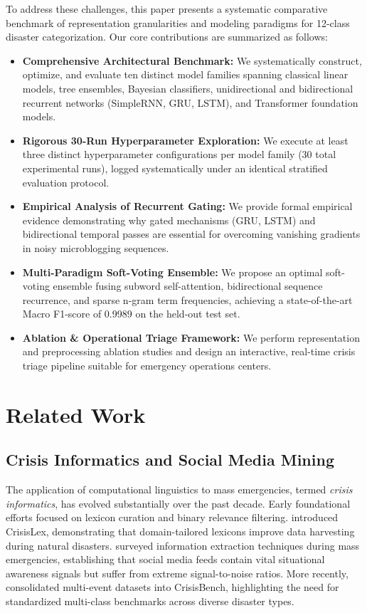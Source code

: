 \documentclass[11pt,a4paper]{article}
\begin{document}
To address these challenges, this paper presents a systematic comparative benchmark of representation granularities and modeling paradigms for 12-class disaster categorization. Our core contributions are summarized as follows:
\begin{itemize}
    \item \textbf{Comprehensive Architectural Benchmark:} We systematically construct, optimize, and evaluate ten distinct model families spanning classical linear models, tree ensembles, Bayesian classifiers, unidirectional and bidirectional recurrent networks (SimpleRNN, GRU, LSTM), and Transformer foundation models.
    \item \textbf{Rigorous 30-Run Hyperparameter Exploration:} We execute at least three distinct hyperparameter configurations per model family (30 total experimental runs), logged systematically under an identical stratified evaluation protocol.
    \item \textbf{Empirical Analysis of Recurrent Gating:} We provide formal empirical evidence demonstrating why gated mechanisms (GRU, LSTM) and bidirectional temporal passes are essential for overcoming vanishing gradients in noisy microblogging sequences.
    \item \textbf{Multi-Paradigm Soft-Voting Ensemble:} We propose an optimal soft-voting ensemble fusing subword self-attention, bidirectional sequence recurrence, and sparse n-gram term frequencies, achieving a state-of-the-art Macro F1-score of 0.9989 on the held-out test set.
    \item \textbf{Ablation & Operational Triage Framework:} We perform representation and preprocessing ablation studies and design an interactive, real-time crisis triage pipeline suitable for emergency operations centers.
\end{itemize}

\section{Related Work}
\label{sec:related}

\subsection{Crisis Informatics and Social Media Mining}
The application of computational linguistics to mass emergencies, termed \textit{crisis informatics}, has evolved substantially over the past decade. Early foundational efforts focused on lexicon curation and binary relevance filtering. \citet{olteanu2014crisislex} introduced CrisisLex, demonstrating that domain-tailored lexicons improve data harvesting during natural disasters. \citet{imran2015processing} surveyed information extraction techniques during mass emergencies, establishing that social media feeds contain vital situational awareness signals but suffer from extreme signal-to-noise ratios. More recently, \citet{alam2021crisisbench} consolidated multi-event datasets into CrisisBench, highlighting the need for standardized multi-class benchmarks across diverse disaster types.
\end{document}
